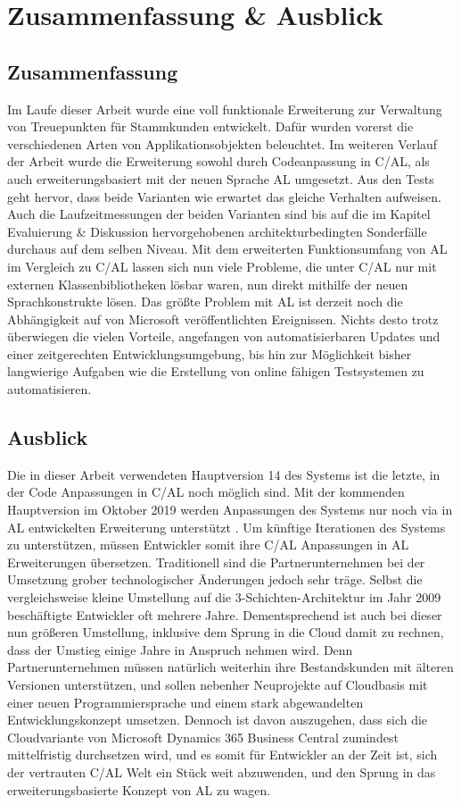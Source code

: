 \chapter{Zusammenfassung \& Ausblick}
\label{cha:Diskussion}

\section{Zusammenfassung}
Im Laufe dieser Arbeit wurde eine voll funktionale Erweiterung zur Verwaltung von Treuepunkten für Stammkunden entwickelt. Dafür wurden vorerst die verschiedenen Arten von Applikationsobjekten beleuchtet. Im weiteren Verlauf der Arbeit wurde die Erweiterung sowohl durch Codeanpassung in C/AL, als auch erweiterungsbasiert mit der neuen Sprache AL umgesetzt. Aus den Tests geht hervor, dass beide Varianten wie erwartet das gleiche Verhalten aufweisen. Auch die Laufzeitmessungen der beiden Varianten sind bis auf die im Kapitel Evaluierung \& Diskussion hervorgehobenen architekturbedingten Sonderfälle durchaus auf dem selben Niveau. Mit dem erweiterten Funktionsumfang von AL im Vergleich zu C/AL lassen sich nun viele Probleme, die unter C/AL nur mit externen Klassenbibliotheken lösbar waren, nun direkt mithilfe der neuen Sprachkonstrukte lösen. Das größte Problem mit AL ist derzeit noch die Abhängigkeit auf von Microsoft veröffentlichten Ereignissen. Nichts desto trotz überwiegen die vielen Vorteile, angefangen von automatisierbaren Updates und einer zeitgerechten Entwicklungsumgebung, bis hin zur Möglichkeit bisher langwierige Aufgaben wie die Erstellung von online fähigen Testsystemen zu automatisieren.

\section{Ausblick}
 Die in dieser Arbeit verwendeten Hauptversion 14 des Systems ist die letzte, in der Code Anpassungen in C/AL noch möglich sind. Mit der kommenden Hauptversion im Oktober 2019 werden Anpassungen des Systems nur noch via in AL entwickelten Erweiterung unterstützt \cite{stefanetti2019}. Um künftige Iterationen des Systems zu unterstützen, müssen Entwickler somit ihre C/AL Anpassungen in AL Erweiterungen übersetzen. Traditionell sind die Partnerunternehmen bei der Umsetzung grober technologischer Änderungen jedoch sehr träge. Selbst die vergleichsweise kleine Umstellung auf die 3-Schichten-Architektur im Jahr 2009 beschäftigte Entwickler oft mehrere Jahre. Dementsprechend ist auch bei dieser nun größeren Umstellung, inklusive dem Sprung in die Cloud damit zu rechnen, dass der Umstieg einige Jahre in Anspruch nehmen wird. Denn Partnerunternehmen müssen natürlich weiterhin ihre Bestandskunden mit älteren Versionen unterstützen, und sollen nebenher Neuprojekte auf Cloudbasis mit einer neuen Programmiersprache und einem stark abgewandelten Entwicklungskonzept umsetzen. Dennoch ist davon auszugehen, dass sich die Cloudvariante von Microsoft Dynamics 365 Business Central zumindest mittelfristig durchsetzen wird, und es somit für Entwickler an der Zeit ist, sich der vertrauten C/AL Welt ein Stück weit abzuwenden, und den Sprung in das  erweiterungsbasierte Konzept von AL zu wagen.

